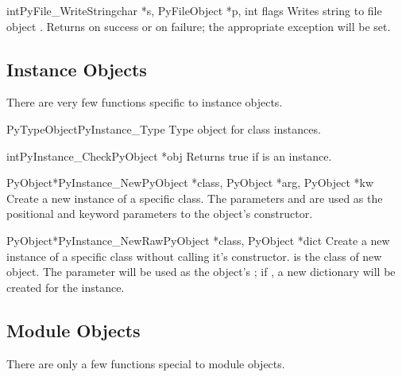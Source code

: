 \documentclass{manual}
\begin{document}
\begin{cfuncdesc}{int}{PyFile_WriteString}{char *s, PyFileObject *p,
                                           int flags}
Writes string  to file object .  Returns  on
success or  on failure; the appropriate exception will be
set.
\end{cfuncdesc}


\subsection{Instance Objects \label{instanceObjects}}

There are very few functions specific to instance objects.

\begin{cvardesc}{PyTypeObject}{PyInstance_Type}
  Type object for class instances.
\end{cvardesc}

\begin{cfuncdesc}{int}{PyInstance_Check}{PyObject *obj}
  Returns true if  is an instance.
\end{cfuncdesc}

\begin{cfuncdesc}{PyObject*}{PyInstance_New}{PyObject *class,
                                             PyObject *arg,
                                             PyObject *kw}
  Create a new instance of a specific class.  The parameters 
  and  are used as the positional and keyword parameters to
  the object's constructor.
\end{cfuncdesc}

\begin{cfuncdesc}{PyObject*}{PyInstance_NewRaw}{PyObject *class,
                                                PyObject *dict}
  Create a new instance of a specific class without calling it's
  constructor.   is the class of new object.  The
   parameter will be used as the object's ;
  if \NULL, a new dictionary will be created for the instance.
\end{cfuncdesc}


\subsection{Module Objects \label{moduleObjects}}

There are only a few functions special to module objects.
\end{document}
